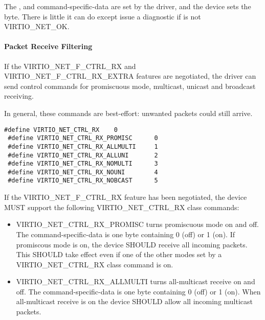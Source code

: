 The ,  and command-specific-data are set by the
driver, and the device sets the  byte. There is little it can
do except issue a diagnostic if  is not
VIRTIO_NET_OK.

\paragraph{Packet Receive Filtering}\label{sec:Device Types / Network Device / Device Operation / Control Virtqueue / Packet Receive Filtering}
\label{sec:Device Types / Network Device / Device Operation / Control Virtqueue / Setting Promiscuous Mode}%

If the VIRTIO_NET_F_CTRL_RX and VIRTIO_NET_F_CTRL_RX_EXTRA
features are negotiated, the driver can send control commands for
promiscuous mode, multicast, unicast and broadcast receiving.

\begin{note}
In general, these commands are best-effort: unwanted
packets could still arrive.
\end{note}

\begin{lstlisting}
#define VIRTIO_NET_CTRL_RX    0
 #define VIRTIO_NET_CTRL_RX_PROMISC      0
 #define VIRTIO_NET_CTRL_RX_ALLMULTI     1
 #define VIRTIO_NET_CTRL_RX_ALLUNI       2
 #define VIRTIO_NET_CTRL_RX_NOMULTI      3
 #define VIRTIO_NET_CTRL_RX_NOUNI        4
 #define VIRTIO_NET_CTRL_RX_NOBCAST      5
\end{lstlisting}



If the VIRTIO_NET_F_CTRL_RX feature has been negotiated,
the device MUST support the following VIRTIO_NET_CTRL_RX class
commands:
\begin{itemize}
\item VIRTIO_NET_CTRL_RX_PROMISC turns promiscuous mode on and
off. The command-specific-data is one byte containing 0 (off) or
1 (on). If promiscous mode is on, the device SHOULD receive all
incoming packets.
This SHOULD take effect even if one of the other modes set by
a VIRTIO_NET_CTRL_RX class command is on.
\item VIRTIO_NET_CTRL_RX_ALLMULTI turns all-multicast receive on and
off. The command-specific-data is one byte containing 0 (off) or
1 (on). When all-multicast receive is on the device SHOULD allow
all incoming multicast packets.
\end{itemize}

